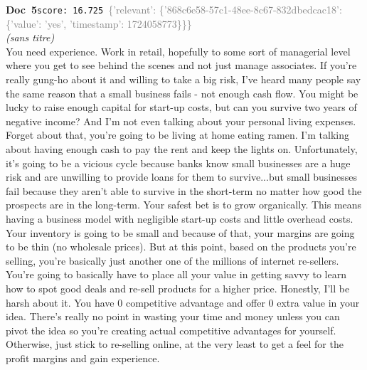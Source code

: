 \documentclass[a4paper,11pt]{article}
\begin{document}
\begin{docenv}
{\footnotesize\textcolor{doccolor}{\textbf{Doc~5}}}\hfill{\tiny\texttt{score:~16.725}}\ {\tiny\textcolor{gray}{\{'relevant': \{'868c6e58-57c1-48ee-8c67-832dbedcac18': \{'value': 'yes', 'timestamp': 1724058773\}\}\}}}\\[3pt]
{\small\textit{(sans titre)}}\\[2pt]
\vspace{2pt}
{\footnotesize 
You need experience. Work in retail, hopefully to some sort of managerial level where you get to see behind the scenes and not just manage associates.  If you're really gung-ho about it and willing to take a big risk, I've heard many people say the same reason that a small business fails - not enough cash flow. You might be lucky to raise enough capital for start-up costs, but can you survive two years of negative income? And I'm not even talking about your personal living expenses. Forget about that, you're going to be living at home eating ramen. I'm talking about having enough cash to pay the rent and keep the lights on. Unfortunately, it's going to be a vicious cycle because banks know small businesses are a huge risk and are unwilling to provide loans for them to survive...but small businesses fail because they aren't able to survive in the short-term no matter how good the prospects are in the long-term.   Your safest bet is to grow organically. This means having a business model with negligible start-up costs and little overhead costs. Your inventory is going to be small and because of that, your margins are going to be thin (no wholesale prices). But at this point, based on the products you're selling, you're basically just another one of the millions of internet re-sellers. You're going to basically have to place all your value in getting savvy to learn how to spot good deals and re-sell products for a higher price.   Honestly, I'll be harsh about it. You have 0 competitive advantage and offer 0 extra value in your idea. There's really no point in wasting your time and money unless you can pivot the idea so you're creating actual competitive advantages for yourself. Otherwise, just stick to re-selling online, at the very least to get a feel for the profit margins and gain experience.}
\end{docenv}
\end{document}
